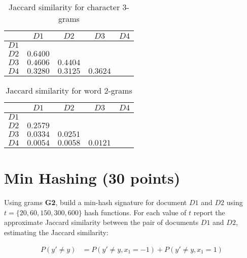 \documentclass[11pt]{article}
\begin{document}
\begin{table}[!ht]  
  \centering
  \caption{Jaccard similarity for character $3$-grams}
  \begin{tabular}{|c|c|c|c|c|}
    \cline{2-5}
    \multicolumn{1}{c|}{} & $D1$ & $D2$ & $D3$ & $D4$\\ \hline
    $D1$ &    &    &   & \\ \hline
    $D2$ & $0.6400$   &    &   & \\ \hline
    $D3$ &  $0.4606$  &  $0.4404$  &   & \\ \hline
    $D4$ & $0.3280$  & $0.3125$  & $0.3624$ & \\ \hline
  \end{tabular}
  \end{table}
  
\begin{table}[!ht]  
  \centering
  \caption{Jaccard similarity for word $2$-grams}
  \begin{tabular}{|c|c|c|c|c|}
    \cline{2-5}
    \multicolumn{1}{c|}{} & $D1$ & $D2$ & $D3$ & $D4$\\ \hline
    $D1$ &    &    &   & \\ \hline
    $D2$ &  $0.2579$  &    &   & \\ \hline
    $D3$ &  $0.0334$  & $0.0251$   &   & \\ \hline
    $D4$ &  $0.0054$ &  $0.0058$ & $0.0121$ & \\ \hline
  \end{tabular}
  \end{table}

\section{Min Hashing (30 points)}
Using grams \textbf{G2}, build a min-hash signature for document $D1$ and $D2$ using $t = \{20, 60, 150, 300, 600\}$ hash functions. For each value of $t$ report the approximate Jaccard similarity between the pair of documents $D1$ and $D2$, estimating the Jaccard similarity:

\begin{equation*}
\begin{aligned}
P(y' \ne y) &= P(y' \ne y, x_1 = -1) + P(y' \ne y, x_1 = 1)
\end{aligned}
\end{equation*} 
\end{document}
